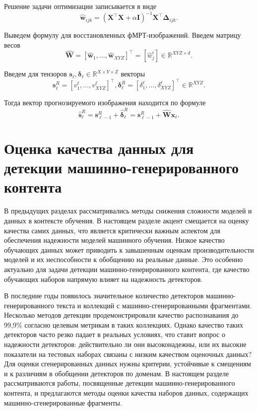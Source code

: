 Решение задачи оптимизации записывается в виде
\begin{equation}
	\label{eq12}
	\hat{\mathbf{w}}_{ijk} = (\mathbf{X}^\top \mathbf{X} + \alpha \mathbf{I})^{-1} \mathbf{X}^\top \mathbf{\Delta}_{ijk}.
\end{equation}

Выведем формулу для восстановленных фМРТ-изображений.
Введем матрицу весов
\begin{equation}
	\label{eq13}
	\hat{\mathbf{W}} = [\hat{\mathbf{w}}_1, \ldots, \hat{\mathbf{w}}_{XYZ}]^\top = [\hat{w}^i_j] \in \mathbb{R}^{XYZ \times d}.
\end{equation}

Введем для тензоров $\mathbf{s}_{\ell}, \boldsymbol{\delta}_{\ell} \in \mathbb{R}^{X \times Y \times Z}$ векторы
\[ \mathbf{s}_{\ell}^{R} = [ v^{\ell}_1, \ldots, v^{\ell}_{XYZ} ]^\top, \boldsymbol{\delta}_{\ell}^{R} = [ \delta^{\ell}_1, \ldots, \delta^{\ell}_{XYZ} ]^\top \in \mathbb{R}^{XYZ}. \]

Тогда вектор прогнозируемого изображения находится по формуле
\begin{equation}
	\label{eq14}
	\hat{\mathbf{s}}_{\ell}^{R} = \mathbf{s}_{\ell-1}^{R} + \hat{\boldsymbol{\delta}}_{\ell}^{R} = \mathbf{s}_{\ell-1}^{R} + \hat{\mathbf{W}} \mathbf{x}_{\ell}.
\end{equation}

\section{Оценка качества данных для детекции машинно-генерированного контента}

В предыдущих разделах рассматривались методы снижения сложности моделей и данных в контексте обучения.
В настоящем разделе акцент смещается на оценку качества самих данных, что является критически важным аспектом для обеспечения надежности моделей машинного обучения.
Низкое качество обучающих данных может приводить к завышенным оценкам производительности моделей и их неспособности к обобщению на реальные данные.
Это особенно актуально для задачи детекции машинно-генерированного контента, где качество обучающих наборов напрямую влияет на надежность детекторов.

В последние годы появилось значительное количество детекторов машинно-генерированного текста и коллекций с машинно-сгенерированными фрагментами.
Несколько методов детекции продемонстрировали качество распознавания до 99,9\% согласно целевым метрикам в таких коллекциях.
Однако качество таких детекторов часто резко падает в реальных условиях, что ставит вопрос о надежности детекторов: действительно ли они высоконадежны, или их высокие показатели на тестовых наборах связаны с низким качеством оценочных данных?
Для оценки сгенерированных данных нужны критерии, устойчивые к смещениям и к различиям в обобщении детекторов по доменам.
В настоящем разделе рассматриваются работы, посвященные детекции машинно-генерированного контента, и предлагаются методы оценки качества наборов данных, содержащих машинно-сгенерированные фрагменты.

